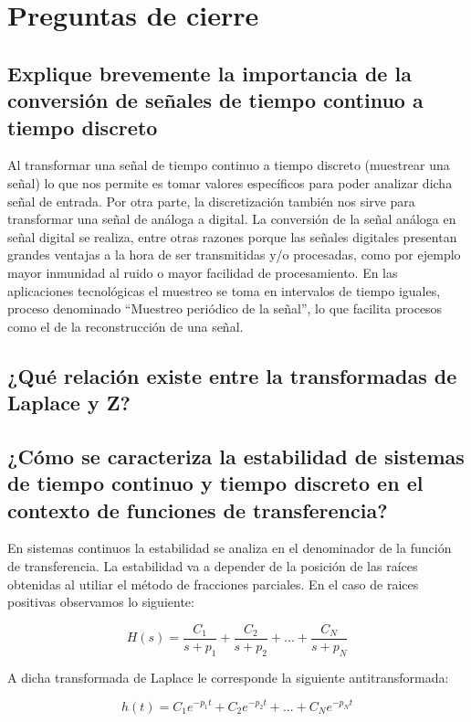 \section{Preguntas de cierre}

\subsection{Explique brevemente la importancia de la conversión de señales de tiempo continuo a tiempo discreto}

Al transformar una señal de tiempo continuo a tiempo discreto (muestrear una señal) lo que nos permite es tomar valores específicos para poder analizar dicha señal de entrada. Por otra parte, la discretización también nos sirve para transformar una señal de análoga a digital. La conversión de la señal análoga en señal digital se realiza, entre otras razones porque las señales digitales presentan grandes ventajas a la hora de ser transmitidas y/o procesadas, como por ejemplo mayor inmunidad al ruido o mayor facilidad de procesamiento.
En las aplicaciones tecnológicas el muestreo se toma en intervalos de tiempo iguales, proceso denominado “Muestreo periódico de la señal”, lo que facilita procesos como el de la reconstrucción de una señal.


\subsection{¿Qué relación existe entre la transformadas de Laplace y Z?}

\subsection{¿Cómo se caracteriza la estabilidad de sistemas de tiempo continuo y tiempo discreto en el contexto de funciones de transferencia?}

En sistemas continuos la estabilidad se analiza en el denominador de la función de transferencia. La estabilidad va a depender de la posición de las raíces obtenidas al utiliar el método de fracciones parciales. En el caso de raices positivas observamos lo siguiente:

\begin{equation}
H(s)=\frac{C_1}{s+p_1}+\frac{C_2}{s+p_2}+...+\frac{C_N}{s+p_N}
\end{equation}

A dicha transformada de Laplace le corresponde la siguiente antitransformada:

\begin{equation}
h(t)=C_1e^{-p_1t}+C_2e^{-p_2t}+...+C_Ne^{-p_Nt}
\end{equation}

